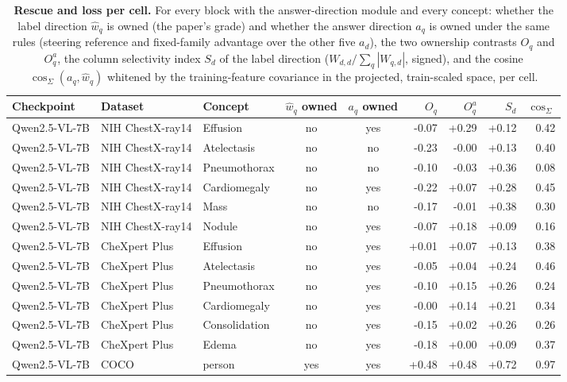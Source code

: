 \begin{table}[p]
\centering
\scriptsize
\setlength{\tabcolsep}{4pt}
\caption{\textbf{Rescue and loss per cell.} For every block with the answer-direction module and every concept: whether the label direction $\hat w_q$ is owned (the paper's grade) and whether the answer direction $a_q$ is owned under the same rules (steering reference and fixed-family advantage over the other five $a_d$), the two ownership contrasts $O_q$ and $O^a_q$, the column selectivity index $S_d$ of the label direction ($W_{d,d}/\sum_q|W_{q,d}|$, signed), and the cosine $\cos_\Sigma(a_q,\hat w_q)$ whitened by the training-feature covariance in the projected, train-scaled space, per cell.}
\label{tab:cf-rescue}
\begin{tabular}{lllccrrrr}
\toprule
Checkpoint & Dataset & Concept & $\hat w_q$ owned & $a_q$ owned & $O_q$ & $O^a_q$ & $S_d$ & $\cos_\Sigma$ \\
\midrule
Qwen2.5-VL-7B & NIH ChestX-ray14 & Effusion & no & yes & -0.07 & +0.29 & +0.12 & 0.42 \\
Qwen2.5-VL-7B & NIH ChestX-ray14 & Atelectasis & no & no & -0.23 & -0.00 & +0.13 & 0.40 \\
Qwen2.5-VL-7B & NIH ChestX-ray14 & Pneumothorax & no & no & -0.10 & -0.03 & +0.36 & 0.08 \\
Qwen2.5-VL-7B & NIH ChestX-ray14 & Cardiomegaly & no & yes & -0.22 & +0.07 & +0.28 & 0.45 \\
Qwen2.5-VL-7B & NIH ChestX-ray14 & Mass & no & no & -0.17 & -0.01 & +0.38 & 0.30 \\
Qwen2.5-VL-7B & NIH ChestX-ray14 & Nodule & no & yes & -0.07 & +0.18 & +0.09 & 0.16 \\
\addlinespace[2pt]
Qwen2.5-VL-7B & CheXpert Plus & Effusion & no & yes & +0.01 & +0.07 & +0.13 & 0.38 \\
Qwen2.5-VL-7B & CheXpert Plus & Atelectasis & no & yes & -0.05 & +0.04 & +0.24 & 0.46 \\
Qwen2.5-VL-7B & CheXpert Plus & Pneumothorax & no & yes & -0.10 & +0.15 & +0.26 & 0.24 \\
Qwen2.5-VL-7B & CheXpert Plus & Cardiomegaly & no & yes & -0.00 & +0.14 & +0.21 & 0.34 \\
Qwen2.5-VL-7B & CheXpert Plus & Consolidation & no & yes & -0.15 & +0.02 & +0.26 & 0.26 \\
Qwen2.5-VL-7B & CheXpert Plus & Edema & no & yes & -0.18 & +0.00 & +0.09 & 0.37 \\
\addlinespace[2pt]
Qwen2.5-VL-7B & COCO & person & yes & yes & +0.48 & +0.48 & +0.72 & 0.97 \\

\end{tabular}
\end{table}

